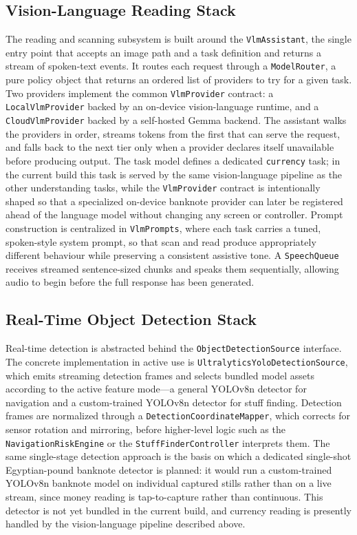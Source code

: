 \documentclass[a4paper]{report}
\begin{document}
\subsection{Vision-Language Reading Stack}
The reading and scanning subsystem is built around the \texttt{VlmAssistant}, the single entry point that accepts an image path and a task definition and returns a stream of spoken-text events. It routes each request through a \texttt{ModelRouter}, a pure policy object that returns an ordered list of providers to try for a given task. Two providers implement the common \texttt{VlmProvider} contract: a \texttt{LocalVlmProvider} backed by an on-device vision-language runtime, and a \texttt{CloudVlmProvider} backed by a self-hosted Gemma backend. The assistant walks the providers in order, streams tokens from the first that can serve the request, and falls back to the next tier only when a provider declares itself unavailable before producing output. The task model defines a dedicated \texttt{currency} task; in the current build this task is served by the same vision-language pipeline as the other understanding tasks, while the \texttt{VlmProvider} contract is intentionally shaped so that a specialized on-device banknote provider can later be registered ahead of the language model without changing any screen or controller. Prompt construction is centralized in \texttt{VlmPrompts}, where each task carries a tuned, spoken-style system prompt, so that scan and read produce appropriately different behaviour while preserving a consistent assistive tone. A \texttt{SpeechQueue} receives streamed sentence-sized chunks and speaks them sequentially, allowing audio to begin before the full response has been generated.

\subsection{Real-Time Object Detection Stack}
Real-time detection is abstracted behind the \texttt{ObjectDetectionSource} interface. The concrete implementation in active use is \texttt{UltralyticsYoloDetectionSource}, which emits streaming detection frames and selects bundled model assets according to the active feature mode---a general YOLOv8n detector for navigation and a custom-trained YOLOv8n detector for stuff finding. Detection frames are normalized through a \texttt{DetectionCoordinateMapper}, which corrects for sensor rotation and mirroring, before higher-level logic such as the \texttt{NavigationRiskEngine} or the \texttt{StuffFinderController} interprets them. The same single-stage detection approach is the basis on which a dedicated single-shot Egyptian-pound banknote detector is planned: it would run a custom-trained YOLOv8n banknote model on individual captured stills rather than on a live stream, since money reading is tap-to-capture rather than continuous. This detector is not yet bundled in the current build, and currency reading is presently handled by the vision-language pipeline described above.
\end{document}
